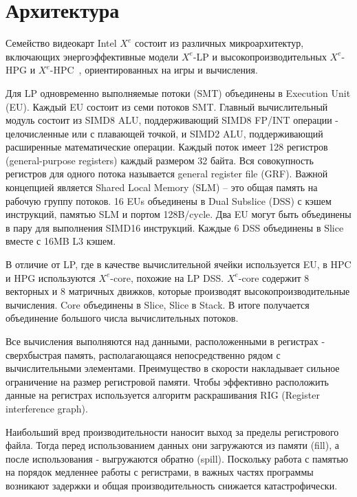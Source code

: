 \section{Архитектура}
\label{sec:Arch}

Семейство видеокарт Intel $X^e$ состоит из различных микроархитектур, включающих энергоэффективные модели $X^e$-LP и высокопроизводительных $X^e$-HPG и $X^e$-HPC~\cite{intelArch}, ориентированных на игры и вычисления.

Для LP одновременно выполняемые потоки (SMT) объединены в Execution Unit (EU).
Каждый EU состоит из семи потоков SMT. Главный вычислительный модуль состоит из SIMD8 ALU, поддерживающий SIMD8 FP/INT операции - целочисленные или с плавающей точкой, и SIMD2 ALU, поддерживающий расширенные математические операции.
Каждый поток имеет 128 регистров (general-purpose registers) каждый размером 32 байта.
Вся совокупность регистров для одного потока называется general register file (GRF).
Важной концепцией является Shared Local Memory (SLM) -- это общая память на рабочую группу потоков.
16 EUs объединены в Dual Subslice (DSS) с кэшем инструкций, памятью SLM и портом 128B/cycle.
Два EU могут быть объединены в пару для выполнения SIMD16 инструкций. Каждые 6 DSS объединены в Slice вместе с 16MB L3 кэшем.

В отличие от LP, где в качестве вычислительной ячейки используется EU, в HPC и HPG используются $X^e$-core, похожие на LP DSS.
$X^e$-core содержит 8 векторных и 8 матричных движков, которые производят высокопроизводительные вычисления.
Core объединены в Slice, Slice в Stack.
В итоге получается объединение большого числа вычислительных потоков.

Все вычисления выполняются над данными, расположенными в регистрах - сверхбыстрая память, располагающаяся непосредственно рядом с вычислительными элементами.
Преимущество в скорости накладывает сильное ограничение на размер регистровой памяти.
Чтобы эффективно расположить данные на регистрах используется алгоритм раскрашивания RIG (Register interference graph).

Наибольший вред производительности наносит выход за пределы регистрового файла. Тогда перед использованием данных они загружаются из памяти (fill), а после использования - выгружаются обратно (spill). Поскольку работа с памятью на порядок медленнее работы с регистрами, в важных частях программы возникают задержки и общая производительность снижается катастрофически.

